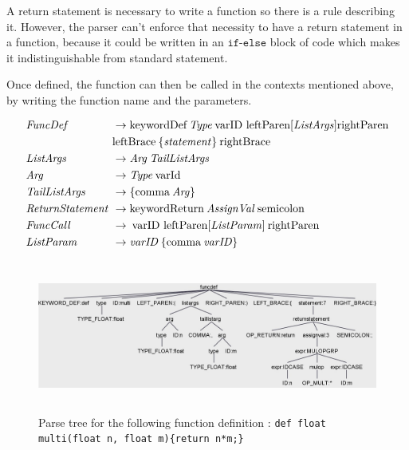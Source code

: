 A return statement is necessary to write a function so there is a rule describing it.
However, the parser can't enforce that necessity to have a return statement in a function, because it could be written in an $\texttt{if-else}$ block of code which makes it indistinguishable from standard statement.

Once defined, the function can then be called in the contexts mentioned above, by writing the function name and the parameters.

\begin{align*}
    \omit $\mathit{FuncDef}$ \hfil &\rightarrow \text{keywordDef} \: \mathit{Type} \: \text{varID leftParen} [\mathit{ListArgs}] \text{rightParen} \\
    & \text{leftBrace} \: \{ \mathit{statement} \} \: \text{rightBrace} \\
    \omit $\mathit{ListArgs}$ \hfil &\rightarrow \mathit{Arg} \:  \mathit{TailListArgs} \\
    \omit $\mathit{Arg}$ \hfil &\rightarrow \mathit{Type} \: \text{varId} \\
    \omit $\mathit{TailListArgs}$ \hfil & \rightarrow \{ \text{comma} \: \mathit{Arg} \} \\
    \omit $\mathit{ReturnStatement}$ \hfil &\rightarrow \text{keywordReturn} \: \mathit{AssignVal} \: \text{semicolon} \\
    \omit $\mathit{FuncCall}$ \hfil &\rightarrow \: \text{varID leftParen} [\mathit{ListParam}] \: \text{rightParen} \\
    \omit $\mathit{ListParam}$ \hfil &\rightarrow \mathit{varID} \:  \{ \text{comma} \: \mathit{varID} \}
\end{align*}

\begin{figure}[H]
    \centering
    \includegraphics[height = 5cm]{figures/parse_trees/parseTree_funcdef}
    \caption{Parse tree for the following function definition : \texttt{def float multi(float n, float m)\{return n*m;\}} }
    \label{fig:parseTree_funcdef}
\end{figure}

